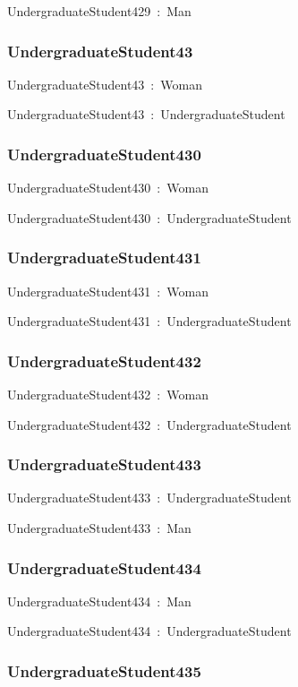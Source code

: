 \documentclass{article}
\begin{document}
UndergraduateStudent429~:~Man

\subsubsection*{UndergraduateStudent43}

UndergraduateStudent43~:~Woman

UndergraduateStudent43~:~UndergraduateStudent

\subsubsection*{UndergraduateStudent430}

UndergraduateStudent430~:~Woman

UndergraduateStudent430~:~UndergraduateStudent

\subsubsection*{UndergraduateStudent431}

UndergraduateStudent431~:~Woman

UndergraduateStudent431~:~UndergraduateStudent

\subsubsection*{UndergraduateStudent432}

UndergraduateStudent432~:~Woman

UndergraduateStudent432~:~UndergraduateStudent

\subsubsection*{UndergraduateStudent433}

UndergraduateStudent433~:~UndergraduateStudent

UndergraduateStudent433~:~Man

\subsubsection*{UndergraduateStudent434}

UndergraduateStudent434~:~Man

UndergraduateStudent434~:~UndergraduateStudent

\subsubsection*{UndergraduateStudent435}
\end{document}
